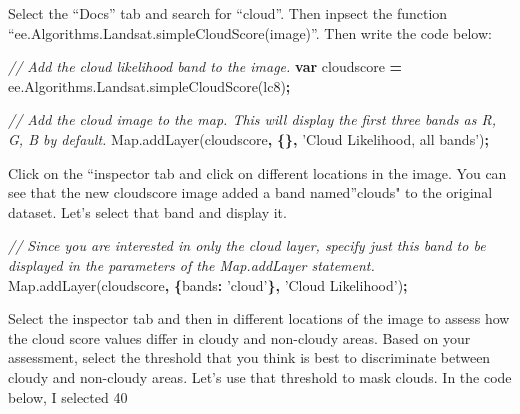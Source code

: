 \documentclass[]{article}
\newenvironment{Shaded}{\begin{snugshade}}{\end{snugshade}}
\newcommand{\AttributeTok}[1]{\textcolor[rgb]{0.77,0.63,0.00}{#1}}
\newcommand{\CommentTok}[1]{\textcolor[rgb]{0.56,0.35,0.01}{\textit{#1}}}
\newcommand{\DataTypeTok}[1]{\textcolor[rgb]{0.13,0.29,0.53}{#1}}
\newcommand{\KeywordTok}[1]{\textcolor[rgb]{0.13,0.29,0.53}{\textbf{#1}}}
\newcommand{\NormalTok}[1]{#1}
\newcommand{\OperatorTok}[1]{\textcolor[rgb]{0.81,0.36,0.00}{\textbf{#1}}}
\newcommand{\StringTok}[1]{\textcolor[rgb]{0.31,0.60,0.02}{#1}}
\newcommand{\VariableTok}[1]{\textcolor[rgb]{0.00,0.00,0.00}{#1}}
\begin{document}
Select the ``Docs'' tab and search for ``cloud''. Then inpsect the
function ``ee.Algorithms.Landsat.simpleCloudScore(image)''. Then write
the code below:

\begin{Shaded}
\begin{Highlighting}[]
\CommentTok{// Add the cloud likelihood band to the image.}
\KeywordTok{var}\NormalTok{ cloudscore }\OperatorTok{=} \VariableTok{ee}\NormalTok{.}\VariableTok{Algorithms}\NormalTok{.}\VariableTok{Landsat}\NormalTok{.}\AttributeTok{simpleCloudScore}\NormalTok{(lc8)}\OperatorTok{;}

\CommentTok{// Add the cloud image to the map. This will display the first three bands as R, G, B by default.}
\VariableTok{Map}\NormalTok{.}\AttributeTok{addLayer}\NormalTok{(cloudscore}\OperatorTok{,} \OperatorTok{\{\},} \StringTok{'Cloud Likelihood, all bands'}\NormalTok{)}\OperatorTok{;}
\end{Highlighting}
\end{Shaded}

Click on the ``inspector tab and click on different locations in the
image. You can see that the new cloudscore image added a band
named''clouds" to the original dataset. Let's select that band and
display it.

\begin{Shaded}
\begin{Highlighting}[]
\CommentTok{// Since you are interested in only the cloud layer, specify just this band to be displayed in the parameters of the Map.addLayer statement. }
\VariableTok{Map}\NormalTok{.}\AttributeTok{addLayer}\NormalTok{(cloudscore}\OperatorTok{,} \OperatorTok{\{}\DataTypeTok{bands}\OperatorTok{:} \StringTok{'cloud'}\OperatorTok{\},} \StringTok{'Cloud Likelihood'}\NormalTok{)}\OperatorTok{;}
\end{Highlighting}
\end{Shaded}

Select the inspector tab and then in different locations of the image to
assess how the cloud score values differ in cloudy and non-cloudy areas.
Based on your assessment, select the threshold that you think is best to
discriminate between cloudy and non-cloudy areas. Let's use that
threshold to mask clouds. In the code below, I selected 40
\end{document}
